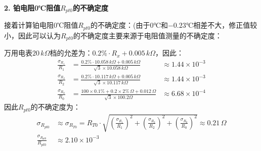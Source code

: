 \documentclass[12pt]{article}
\begin{document}
\textbf{2. 铂电阻0℃阻值$R_{pt0}$的不确定度} \\
\par 
接着计算铂电阻0℃阻值$R_{pt0}$的不确定度：(由于$0\text{℃}$和$-0.23\text{℃}$相差不大，修正值较小，因此可以认为$R_{pt0}$的不确定度主要来源于电阻值测量的不确定度：\\
\par
万用电表$20\,k\Omega$档的允差为：$0.2\%\cdot R_x + 0.005\,k\Omega$，因此：
\begin{equation*}
\begin{aligned}
     \frac{\sigma_{R_1}}{R_1} &= \frac{0.2\%\cdot 10.058\,k\Omega + 0.005\,k\Omega}{\sqrt{3}\times 10.058\,k\Omega} &\approx 1.44\times10^{-3} \\
     \frac{\sigma_{R_2}}{R_2} &= \frac{0.2\%\cdot 10.117\,k\Omega + 0.005\,k\Omega}{\sqrt{3}\times 10.117\,k\Omega} &\approx 1.44\times10^{-3} \\
     \frac{\sigma_{R_0}}{R_0} &= \frac{100\times 0.1\%+0.2\times 2\%\,\Omega+0.012\,\Omega}{\sqrt{3}\times 100.2\Omega} &\approx 6.68\times10^{-4}
    \end{aligned}
\end{equation*}
\quad 因此$R_{pt0}$的不确定度为：
\begin{equation*}
\begin{aligned}
    \sigma_{R_{pt0}} &\approx \sigma_{R_{T0}} = R_{T0}\cdot\sqrt{\left(\frac{\sigma_{R_1}}{R_1}\right)^2 + \left(\frac{\sigma_{R_2}}{R_2}\right)^2 + \left(\frac{\sigma_{R_0}}{R_0}\right)^2} \approx 0.21\,\Omega \\
    \frac{\sigma_{R_{pt0}}}{R_{pt0}} &\approx 2.10\times10^{-3}
\end{aligned}
\end{equation*}
\end{document}
